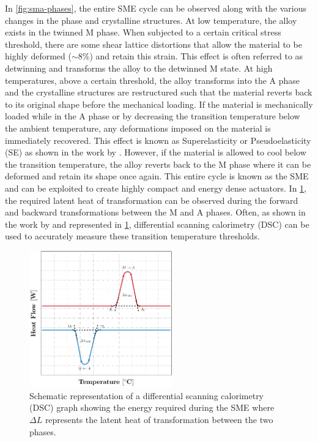 In \cref{fig:sma-phases}, the entire SME cycle can be observed along with the various changes in the phase and crystalline structures. At low temperature, the alloy exists in the twinned M phase. When subjected to a certain critical stress threshold, there are some shear lattice distortions that allow the material to be highly deformed ($\sim8$\%) and retain this strain. This effect is often referred to as detwinning and transforms the alloy to the detwinned M state. At high temperatures, above a certain threshold, the alloy transforms into the A phase and the crystalline structures are restructured such that the material reverts back to its original shape before the mechanical loading. If the material is mechanically loaded while in the A phase or by decreasing the transition temperature below the ambient temperature, any deformations imposed on the material is immediately recovered. This effect is known as Superelasticity or Pseudoelasticity (SE) as shown in the work by \cite{otsukaPseudoelasticityShapeMemory1986}. However, if the material is allowed to cool below the transition temperature, the alloy reverts back to the M phase where it can be deformed and retain its shape once again. This entire cycle is known as the SME and can be exploited to create highly compact and energy dense actuators. In \cref{fig:dsc-graph}, the required latent heat of transformation can be observed during the forward and backward transformations between the M and A phases. Often, as shown in the work by \cite{heDSCAnalysisReverse2004} and represented in \cref{fig:dsc-graph}, differential scanning calorimetry (DSC) can be used to accurately measure these transition temperature thresholds.

\begin{figure}[hbt]
    \centering
    \includegraphics[width=0.55\textwidth]{images/chap2/dsc-graph.pdf}
    \caption[Schematic representation of a differential scanning calorimetry (DSC) graph showing the energy required during the SME]{Schematic representation of a differential scanning calorimetry (DSC) graph showing the energy required during the SME where $\Delta L$ represents the latent heat of transformation between the two phases.}
    \label{fig:dsc-graph}
\end{figure}

